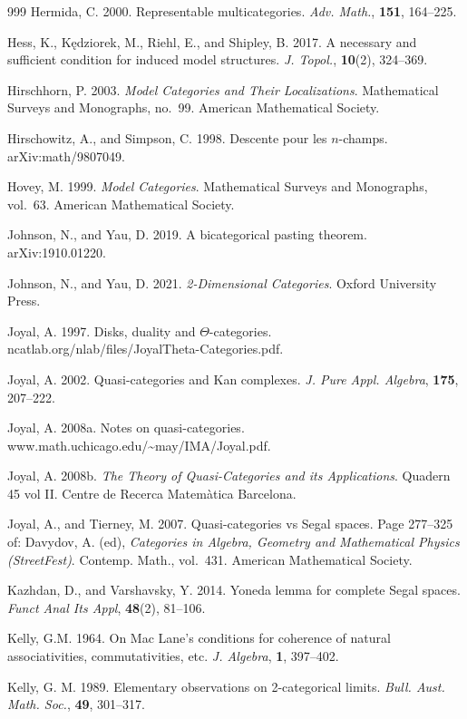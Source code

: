 \begin{thebibliography}{999}
 Hermida, C. 2000. Representable multicategories. \emph{Adv.
  Math.}, \textbf{151}, 164--225.

 Hess, K., Kędziorek, M., Riehl, E., and Shipley, B. 2017. A
  necessary and sufficient condition for induced model structures. \emph{J.
  Topol.}, \textbf{10}(2), 324--369.

 Hirschhorn, P. 2003. \emph{Model Categories and Their
  Localizations}. Mathematical Surveys and Monographs, no.~99. American
  Mathematical Society.

 Hirschowitz, A., and Simpson, C. 1998. Descente pour les
  $n$-champs. arXiv:math/9807049.

 Hovey, M. 1999. \emph{Model Categories}. Mathematical Surveys and
  Monographs, vol.~63. American Mathematical Society.

 Johnson, N., and Yau, D. 2019. A bicategorical pasting theorem.
  arXiv:1910.01220.

 Johnson, N., and Yau, D. 2021. \emph{2-Dimensional Categories}.
  Oxford University Press.

 Joyal, A. 1997. Disks, duality and $\Theta$-categories.
  ncatlab.org/nlab/files/JoyalTheta-Categories.pdf.

 Joyal, A. 2002. Quasi-categories and Kan complexes. \emph{J.
  Pure Appl. Algebra}, \textbf{175}, 207--222.

 Joyal, A. 2008a. Notes on quasi-categories.
  www.math.uchicago.edu/\textasciitilde{}may/IMA/Joyal.pdf.

 Joyal, A. 2008b. \emph{The Theory of Quasi-Categories and its
  Applications}. Quadern 45 vol II. Centre de Recerca Matemàtica Barcelona.

 Joyal, A., and Tierney, M. 2007. Quasi-categories vs Segal
  spaces. Page 277--325 of: Davydov, A. (ed), \emph{Categories in Algebra,
  Geometry and Mathematical Physics (StreetFest)}. Contemp. Math., vol.~431.
  American Mathematical Society.

 Kazhdan, D., and Varshavsky, Y. 2014. Yoneda lemma for complete
  Segal spaces. \emph{Funct Anal Its Appl}, \textbf{48}(2), 81--106.

 Kelly, G.M. 1964. On Mac Lane's conditions for coherence of
  natural associativities, commutativities, etc. \emph{J. Algebra},
  \textbf{1}, 397--402.

 Kelly, G. M. 1989. Elementary observations on 2-categorical
  limits. \emph{Bull. Aust. Math. Soc.}, \textbf{49}, 301--317.


\end{thebibliography}
